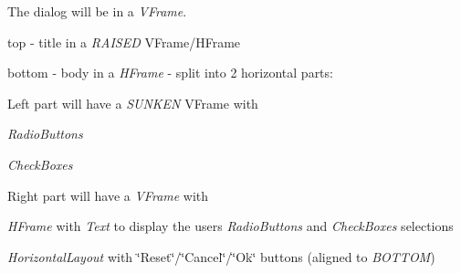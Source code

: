 \begin{DoxyItemize}
\item The dialog will be in a {\itshape V\+Frame}.
\begin{DoxyItemize}
\item top -\/ title in a {\itshape R\+A\+I\+S\+ED} V\+Frame/\+H\+Frame
\item bottom -\/ body in a {\itshape H\+Frame} -\/ split into 2 horizontal parts\+:
\begin{DoxyItemize}
\item Left part will have a {\itshape S\+U\+N\+K\+EN} V\+Frame with
\begin{DoxyItemize}
\item {\itshape Radio\+Buttons}
\item {\itshape Check\+Boxes}
\end{DoxyItemize}
\item Right part will have a {\itshape V\+Frame} with
\begin{DoxyItemize}
\item {\itshape H\+Frame} with {\itshape Text} to display the user\textquotesingle{}s {\itshape Radio\+Buttons} and {\itshape Check\+Boxes} selections
\item {\itshape Horizontal\+Layout} with \char`\"{}\+Reset\char`\"{}/\char`\"{}\+Cancel\char`\"{}/\char`\"{}\+Ok\char`\"{} buttons (aligned to {\itshape B\+O\+T\+T\+OM})
\end{DoxyItemize}
\end{DoxyItemize}
\end{DoxyItemize}
\end{DoxyItemize}


